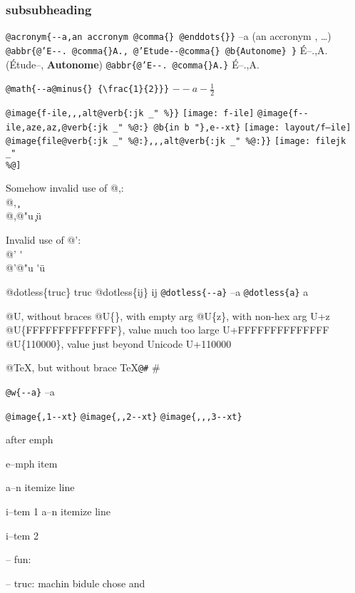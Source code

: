 \documentclass{book}
\newcommand{\GNUTexinfoplaceholder}[1]{}
\newcommand{\GNUTexinfonopagebreakheading}[2]{\let\clearpage\relax \let\cleardoublepage\relax \let\thispagestyle\GNUTexinfoplaceholder #1{#2}}
\renewcommand{\includegraphics}[1]{\fbox{FIG #1}}
\begin{document}
\begin{titlepage}
\GNUTexinfonopagebreakheading{\subsubsection*}{subsubheading}


\texttt{@acronym\{{-}{-}a,an accronym @comma\{\} @enddots\{\}\}} --a (an accronym , \dots{})
\texttt{@abbr\{@'E{-}{-}. @comma\{\}A., @'Etude{-}{-}@comma\{\} @b\{Autonome\} \}} \'{E}--.\@ ,A.\@ (\'{E}tude--, \textbf{Autonome})
\texttt{@abbr\{@'E{-}{-}. @comma\{\}A.\}} \'{E}--.\@ ,A.\@

\texttt{@math\{{-}{-}a@minus\{\} \{\textbackslash{}frac\{1\}\{2\}\}\}} $--a- {\frac{1}{2}}$

\texttt{@image\{f-ile,,,alt@verb\{:jk \_" \%\@\}\}} \texttt{[image: f-ile]}
\texttt{@image\{f{-}{-}ile,aze,az,@verb\{:jk \_" \%@:\} @b\{in b "\},e{-}{-}xt\}} \texttt{[image: layout/f--ile]}
\texttt{@image\{file@verb\{:jk \_" \%@:\},,,alt@verb\{:jk \_" \%@:\}\}} \texttt{[image: filejk \\\_" \\\%@]}




Somehow invalid use of @,:\leavevmode{}\\
@, \c{}
\leavevmode{}\\
@,@"u \c{}\"{u}

Invalid use of @':\leavevmode{}\\
@' \'{}
\leavevmode{}\\
@'@"u \'{}\"{u}

@dotless\{truc\} truc
@dotless\{ij\} ij
\texttt{@dotless\{{-}{-}a\}} --a
\texttt{@dotless\{a\}} a

@U, without braces @U\{\}, with empty arg 
@U\{z\}, with non-hex arg U+z
@U\{FFFFFFFFFFFFFF\}, value much too large U+FFFFFFFFFFFFFF
@U\{110000\}, value just beyond Unicode U+110000

@TeX, but without brace \TeX{}\texttt{@\#} \#

\texttt{@w\{{-}{-}a\}} \hbox{--a}

\texttt{@image\{,1{-}{-}xt\}} 
\texttt{@image\{,,2{-}{-}xt\}} 
\texttt{@image\{,,,3{-}{-}xt\}} 


\emph{} after emph 

e--mph item

\textbullet{} a--n itemize line 

i--tem 1
\textbullet{} a--n itemize line 

i--tem 2

\hbox{}-- fun: 


\hbox{}-- truc: machin bidule chose and



\end{titlepage}
\end{document}
